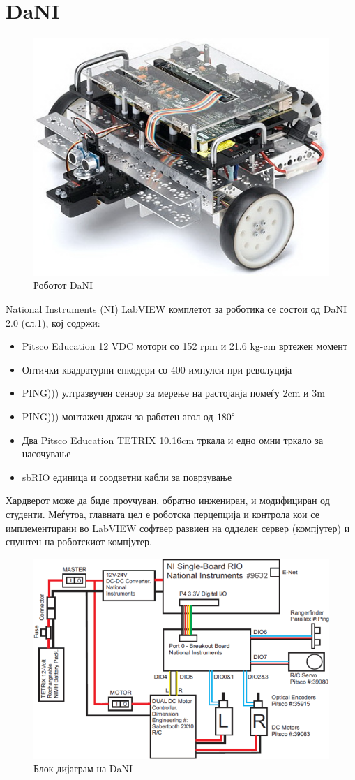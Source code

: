 \documentclass[12pt]{article}
\begin{document}
\newpage

\section{DaNI}
  \begin{figure}[H]
    \includegraphics[width=0.6\linewidth, keepaspectratio]{./images/dani_isometric.jpg}
    \centering
    \caption{Роботот DaNI}
    \label{fig:dani_isometric.jpg}
    \end{figure}
	National Instruments (NI) LabVIEW комплетот за роботика се состои од DaNI 2.0 (сл.\ref{fig:dani_isometric.jpg}), кој содржи:

	\begin{itemize}
		\item Pitsco Education 12 VDC мотори со 152 rpm и 21.6 kg-cm вртежен момент
		\item Оптички квадратурни енкодери со 400 импулси при револуција
		\item PING))) ултразвучен сензор за мерење на растојанја помеѓу 2cm и 3m
		\item PING))) монтажен држач за работен агол од $180 \degree$
		\item Два Pitsco Education TETRIX 10.16cm тркала и едно омни тркало за насочување
		\item sbRIO единица и соодветни кабли за поврзување
		\end{itemize}

	Хардверот може да биде проучуван, обратно инжениран, и модифициран од студенти. Меѓутоа, главната цел е роботска перцепција и контрола кои се имплементирани во LabVIEW софтвер развиен на одделен сервер (компјутер) и спуштен на роботскиот компјутер.

	\begin{figure}[H]
		\includegraphics[width=0.75\linewidth]{./images/dani_block_diagram.png}
		\centering
		\caption{Блок дијаграм на DaNI}
		\label{fig:dani_block_diagram.png}
		\end{figure}
\end{document}
